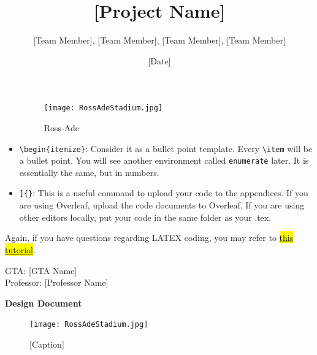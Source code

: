 \documentclass[letterpaper, 11pt]{article}
\begin{document}
\begin{itemize}
          \begin{figure}[!ht]
              \centering
              \texttt{[image: RossAdeStadium.jpg]} %
              \caption{Ross-Ade}
          \end{figure}

    \item \verb|\begin{itemize}|: Consider it as a bullet point template. Every \verb|\item| will be a bullet point. You will see another environment called \verb|enumerate| later. It is essentially the same, but in numbers.

    \item \verb|]{}|: This is a useful command to upload your code to the appendices. If you are using Overleaf, upload the code documents to Overleaf. If you are using other editors locally, put your code in the same folder as your .tex.
\end{itemize}
Again, if you have questions regarding LATEX coding, you may refer to \href{https://www.overleaf.com/learn/latex/Learn_LaTeX_in_30_minutes}{\hl{this tutorial}}.


\title{[Project Name]}
\author{[Team Member], [Team Member], [Team Member], [Team Member]}
\date{[Date]}
\maketitle
\begin{center}
    GTA: [GTA Name] \\
    Professor: [Professor Name]
\end{center}
\begin{center}
    \textbf{Design Document}
\end{center}

\begin{figure}[h]
    \centering
    \texttt{[image: RossAdeStadium.jpg]}
    \caption{[Caption]}
\end{figure}


\clearpage
\tableofcontents %
\end{document}
